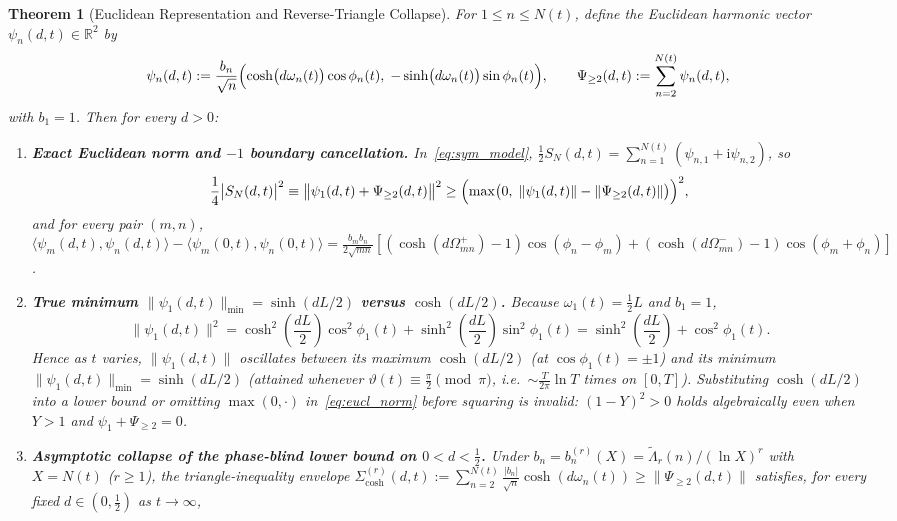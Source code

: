 \documentclass[11pt,reqno]{amsart}
\newtheorem{theorem}{Theorem}[section]
\theoremstyle{definition}
\theoremstyle{remark}
\numberwithin{equation}{section}
\newcommand{\ii}{\mathrm{i}}
\newcommand{\R}{\mathbb{R}}
\begin{document}
\begin{theorem}[Euclidean Representation and Reverse-Triangle Collapse]\label{thm:reverse_triangle}
For $1 \le n \le N(t)$, define the Euclidean harmonic vector $\psi_n(d,t) \in \R^2$ by
\begin{equation}\label{eq:psi_vec}
\psi_n(d,t) := \frac{b_n}{\sqrt{n}}\Bigl(\cosh\bigl(d\omega_n(t)\bigr)\cos\phi_n(t),\; -\sinh\bigl(d\omega_n(t)\bigr)\sin\phi_n(t)\Bigr), \qquad \Psi_{\ge 2}(d,t) := \sum_{n=2}^{N(t)} \psi_n(d,t),
\end{equation}
with $b_1 = 1$. Then for every $d > 0$:
\begin{enumerate}[label=\textup{(\roman*)},leftmargin=2.2em]
\item \textbf{Exact Euclidean norm and $-1$ boundary cancellation.} In~\eqref{eq:sym_model}, $\frac{1}{2}S_N(d,t) = \sum_{n=1}^{N(t)}(\psi_{n,1} + \ii\psi_{n,2})$, so
\begin{equation}\label{eq:eucl_norm}
\frac{1}{4}\bigl\lvert S_N(d,t)\bigr\rvert^2 \equiv \bigl\lVert\psi_1(d,t) + \Psi_{\ge 2}(d,t)\bigr\rVert^2 \ge \Bigl(\max\bigl(0,\; \lVert\psi_1(d,t)\rVert - \lVert\Psi_{\ge 2}(d,t)\rVert\bigr)\Bigr)^2,
\end{equation}
and for every pair $(m,n)$, $\langle\psi_m(d,t), \psi_n(d,t)\rangle - \langle\psi_m(0,t), \psi_n(0,t)\rangle = \frac{b_m b_n}{2\sqrt{mn}}[(\cosh(d\Omega_{mn}^+)-1)\cos(\phi_n-\phi_m) + (\cosh(d\Omega_{mn}^-)-1)\cos(\phi_m+\phi_n)]$.
\item \textbf{True minimum $\lVert\psi_1(d,t)\rVert_{\min} = \sinh(dL/2)$ versus $\cosh(dL/2)$.} Because $\omega_1(t) = \frac{1}{2}L$ and $b_1 = 1$,
\begin{equation}\label{eq:psi1_extremal}
\bigl\lVert\psi_1(d,t)\bigr\rVert^2 = \cosh^2\!\left(\frac{dL}{2}\right)\cos^2\phi_1(t) + \sinh^2\!\left(\frac{dL}{2}\right)\sin^2\phi_1(t) = \sinh^2\!\left(\frac{dL}{2}\right) + \cos^2\phi_1(t).
\end{equation}
Hence as $t$ varies, $\lVert\psi_1(d,t)\rVert$ oscillates between its maximum $\cosh(dL/2)$ (at $\cos\phi_1(t) = \pm 1$) and its \emph{minimum} $\lVert\psi_1(d,t)\rVert_{\min} = \sinh(dL/2)$ (attained whenever $\vartheta(t) \equiv \frac{\pi}{2} \pmod{\pi}$, i.e.\ $\sim \frac{T}{2\pi}\ln T$ times on $[0, T]$). Substituting $\cosh(dL/2)$ into a lower bound or omitting $\max(0, \cdot)$ in~\eqref{eq:eucl_norm} before squaring is invalid: $(1 - Y)^2 > 0$ holds algebraically even when $Y > 1$ and $\psi_1 + \Psi_{\ge 2} = 0$.
\item \textbf{Asymptotic collapse of the phase-blind lower bound on $0 < d < \frac{1}{2}$.} Under $b_n = b_n^{(r)}(X) = \widetilde{\Lambda}_r(n)/(\ln X)^r$ with $X = N(t)$ ($r \ge 1$), the triangle-inequality envelope $\Sigma_{\cosh}^{(r)}(d,t) := \sum_{n=2}^{N(t)} \frac{\lvert b_n\rvert}{\sqrt{n}}\cosh(d\omega_n(t)) \ge \lVert\Psi_{\ge 2}(d,t)\rVert$ satisfies, for every fixed $d \in (0, \frac{1}{2})$ as $t \to \infty$,

\end{enumerate}
\end{theorem}
\end{document}
